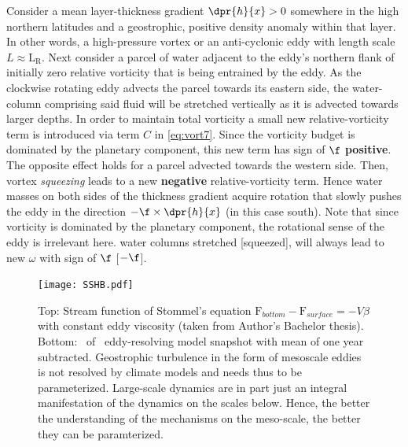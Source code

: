 \begin{driftspeed}
\label{box:speed_dens}
Consider a mean layer-thickness gradient $\dpr{h}{x}>0$ somewhere in the high northern latitudes and a geostrophic, positive density anomaly within that layer.
In other words, a high-pressure vortex or an anti-cyclonic eddy with length scale $L\approx \mathrm{L_{R}}$.
Next consider a parcel of water adjacent to the eddy's northern flank of initially zero relative vorticity that is being entrained by the eddy.
As the clockwise rotating eddy advects the parcel towards its eastern side, the water-column comprising said fluid will be stretched vertically as it is advected towards larger depths. In order to maintain total vorticity a small new relative-vorticity term is introduced via term $C$ in \eqref{eq:vort7}.
Since the vorticity budget is dominated by the planetary component, this new term has sign of $\f$ \ie \textbf{positive}.
The opposite effect holds for a parcel advected towards the western side. Then, vortex \textit{squeezing} leads to a new \textbf{negative} relative-vorticity term.
Hence water masses on both sides of the thickness gradient acquire rotation that slowly pushes the eddy in the direction $-\f\times \dpr{h}{x}$ (in this case south).
Note  that since vorticity is dominated by the planetary component, the rotational sense of the eddy is irrelevant here. \Ie water columns stretched [squeezed], will always lead to new $\omega$ with sign of $\f$ [$-\f$].
\end{driftspeed}
\begin{figure}
\texttt{[image: SSHB.pdf]}
  \caption{Top: Stream function of Stommel's equation $\mathrm{F}_{bottom}-\mathrm{F}_{surface}= -V\beta$ with constant eddy viscosity (taken from Author's Bachelor thesis). Bottom: \SSH~of \POP~eddy-resolving model snapshot with mean of one year subtracted.
   Geostrophic turbulence in the form of mesoscale eddies is not resolved by climate models and needs thus to be parameterized. Large-scale dynamics are in part just an integral manifestation of the dynamics on the scales below. Hence, the better the understanding of the mechanisms on the meso-scale, the better they can be paramterized.}
  \label{fig:SSHB}
\end{figure}
